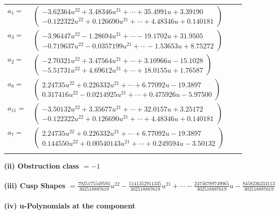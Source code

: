 \documentclass[1p]{elsarticle_modified}
\theoremstyle{definition}
\begin{document}
\begin{tabular}{m{7pt} m{180pt} m{7pt} m{180pt} }
\flushright $a_{1}=$&$\begin{pmatrix}-3.62364 u^{22}+3.48346 u^{21}+\cdots+35.4991 u+3.39190\\-0.122322 u^{22}+0.126690 u^{21}+\cdots+4.48346 u+0.140181\end{pmatrix}$ \\
\flushright $a_{3}=$&$\begin{pmatrix}-3.96447 u^{22}-1.28694 u^{21}+\cdots-19.1702 u+31.9505\\-0.719637 u^{22}-0.0357199 u^{21}+\cdots-1.53653 u+8.75272\end{pmatrix}$ \\
\flushright $a_{2}=$&$\begin{pmatrix}-2.70321 u^{22}+3.47564 u^{21}+\cdots+3.10966 u-15.1028\\-5.51731 u^{22}+4.69612 u^{21}+\cdots+18.0155 u+1.76587\end{pmatrix}$ \\
\flushright $a_{8}=$&$\begin{pmatrix}2.24735 u^{22}+0.226332 u^{21}+\cdots+6.77092 u-19.3897\\0.317416 u^{22}-0.0214925 u^{21}+\cdots+0.475926 u-5.97500\end{pmatrix}$ \\
\flushright $a_{11}=$&$\begin{pmatrix}-3.50132 u^{22}+3.35677 u^{21}+\cdots+32.0157 u+3.25172\\-0.122322 u^{22}+0.126690 u^{21}+\cdots+4.48346 u+0.140181\end{pmatrix}$ \\
\flushright $a_{7}=$&$\begin{pmatrix}2.24735 u^{22}+0.226332 u^{21}+\cdots+6.77092 u-19.3897\\0.144550 u^{22}+0.00540143 u^{21}+\cdots+0.249594 u-3.50132\end{pmatrix}$\\&\end{tabular}
\flushleft \textbf{(ii) Obstruction class $= -1$}\\~\\
\flushleft \textbf{(iii) Cusp Shapes $= \frac{7925175549593}{302518887619} u^{22}-\frac{5141352911335}{302518887619} u^{21}+\cdots-\frac{24756789749065}{302518887619} u-\frac{8458236233113}{302518887619}$}\\~\\
\newpage\renewcommand{\arraystretch}{1}
\flushleft \textbf{(iv) u-Polynomials at the component}\newline \\
\end{document}
